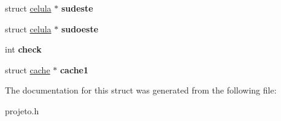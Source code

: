 \begin{DoxyCompactItemize}
struct \mbox{\hyperlink{structcelula}{celula}} $\ast$ {\bfseries sudeste}
\item 
\mbox{\label{structcelula_a47a954c4e06fb1d4652de3bb35216ddb}} 
struct \mbox{\hyperlink{structcelula}{celula}} $\ast$ {\bfseries sudoeste}
\item 
\mbox{\label{structcelula_a5aa1731610537e057191db627c19f1ca}} 
int {\bfseries check}
\item 
\mbox{\label{structcelula_a308f3964ab5a8295d510d949f1abb951}} 
struct \mbox{\hyperlink{structcache}{cache}} $\ast$ {\bfseries cache1}
\end{DoxyCompactItemize}


The documentation for this struct was generated from the following file\+:\begin{DoxyCompactItemize}
\item 
projeto.\+h\end{DoxyCompactItemize}

